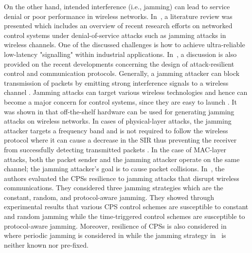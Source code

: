 On the other hand, intended interference (i.e., jamming) can lead to service denial or poor performance in wireless networks. In~\cite{8631535}, a literature review was presented which includes an overview of recent research efforts on networked control systems under denial-of-service attacks such as jamming attacks in wireless channels. One of the discussed challenges is how to achieve ultra-reliable low-latency "signalling" within industrial applications. In~\cite{Cetinkaya_2019}, a discussion is also provided on the recent developments concerning the design of attack-resilient control and communication protocols. Generally, a jamming attacker can block transmission of packets by emitting strong interference signals to a wireless channel \cite{1637931,5473884}. Jamming attacks can target various wireless technologies and hence can become a major concern for control systems, since they are easy to launch \cite{5473884}. It was shown in \cite{10.1007/978-3-319-07788-8_40} that off-the-shelf hardware can be used for generating jamming attacks on wireless networks. In cases of physical-layer attacks, the jamming attacker targets a frequency band and is not required to follow the wireless protocol where it can cause a decrease in the SIR thus preventing the receiver from successfully detecting transmitted packets \cite{10.1007/978-3-319-07788-8_40}. In the case of MAC-layer attacks, both the packet sender and the jamming attacker operate on the same channel; the jamming attacker’s goal is to cause packet collisions.
In~\cite{8726803}, the authors evaluated the CPSs resilience to jamming attacks that disrupt wireless communications. They considered three jamming strategies which are the constant, random, and protocol-aware jamming. They showed through experimental results that various CPS control schemes are susceptible to constant and random jamming while the time-triggered control schemes are susceptible to protocol-aware jamming. Moreover, resilience of CPSs is also considered in~\cite{6425868,DEPERSIS2014134,7402971,7575630} where periodic jamming is considered in \cite{6425868} while the jamming strategy in~\cite{DEPERSIS2014134,7402971,7575630} is neither known nor pre-fixed. 
 
